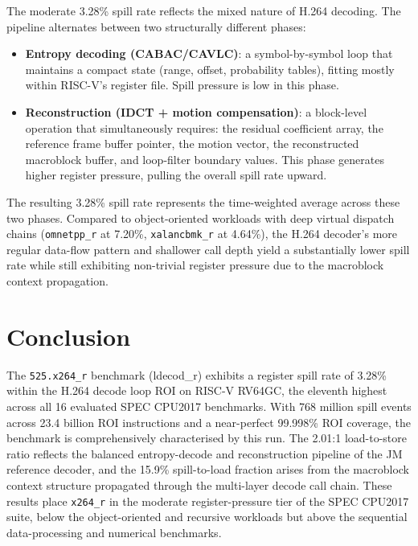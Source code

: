 \documentclass[conference]{IEEEtran}
\begin{document}
The moderate 3.28\% spill rate reflects the mixed nature of H.264
decoding. The pipeline alternates between two structurally different
phases:
\begin{itemize}
    \item \textbf{Entropy decoding (CABAC/CAVLC)}: a symbol-by-symbol
          loop that maintains a compact state (range, offset, probability
          tables), fitting mostly within RISC-V's register file. Spill
          pressure is low in this phase.
    \item \textbf{Reconstruction (IDCT + motion compensation)}: a
          block-level operation that simultaneously requires: the residual
          coefficient array, the reference frame buffer pointer, the motion
          vector, the reconstructed macroblock buffer, and loop-filter
          boundary values. This phase generates higher register pressure,
          pulling the overall spill rate upward.
\end{itemize}
The resulting 3.28\% spill rate represents the time-weighted average
across these two phases. Compared to object-oriented workloads with
deep virtual dispatch chains (\texttt{omnetpp\_r} at 7.20\%,
\texttt{xalancbmk\_r} at 4.64\%), the H.264 decoder's more regular
data-flow pattern and shallower call depth yield a substantially lower
spill rate while still exhibiting non-trivial register pressure due
to the macroblock context propagation.

\section{Conclusion}

The \texttt{525.x264\_r} benchmark (ldecod\_r) exhibits a register
spill rate of 3.28\% within the H.264 decode loop ROI on RISC-V
RV64GC, the eleventh highest across all 16 evaluated SPEC CPU2017
benchmarks. With 768 million spill events across 23.4 billion ROI
instructions and a near-perfect 99.998\% ROI coverage, the benchmark
is comprehensively characterised by this run. The 2.01:1 load-to-store
ratio reflects the balanced entropy-decode and reconstruction pipeline
of the JM reference decoder, and the 15.9\% spill-to-load fraction
arises from the macroblock context structure propagated through the
multi-layer decode call chain. These results place \texttt{x264\_r}
in the moderate register-pressure tier of the SPEC CPU2017 suite,
below the object-oriented and recursive workloads but above the
sequential data-processing and numerical benchmarks.
\end{document}
